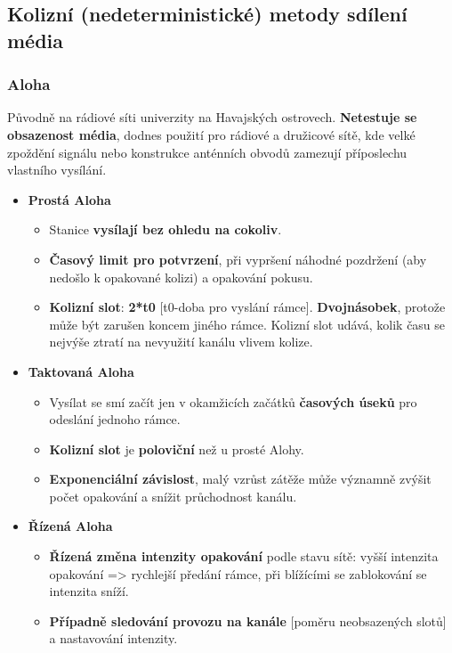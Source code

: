 \subsection{Kolizní (nedeterministické) metody sdílení média}
\subsubsection{Aloha}
Původně na rádiové síti univerzity na Havajských ostrovech. \textbf{Netestuje se obsazenost média}, dodnes použití pro rádiové a družicové sítě, kde velké zpoždění signálu nebo konstrukce anténních obvodů zamezují příposlechu vlastního vysílání.

\begin{itemize}
	\item \textbf{Prostá Aloha}
\begin{itemize}
\item Stanice \textbf{vysílají bez ohledu na cokoliv}.
\item \textbf{Časový limit pro potvrzení}, při vypršení náhodné pozdržení (aby nedošlo k opakované kolizi) a opakování pokusu.
\item \textbf{Kolizní slot}: \textbf{2*t0} [t0-doba pro vyslání rámce]. \textbf{Dvojnásobek}, protože může být zarušen koncem jiného rámce. Kolizní slot udává, kolik času se nejvýše ztratí na nevyužití kanálu vlivem kolize. 
\end{itemize}

\item \textbf{Taktovaná Aloha}
\begin{itemize}
\item Vysílat se smí začít jen v okamžicích začátků \textbf{časových úseků} pro odeslání jednoho rámce.
\item \textbf{Kolizní slot} je \textbf{poloviční} než u prosté Alohy.
\item \textbf{Exponenciální závislost}, malý vzrůst zátěže může významně zvýšit počet opakování a snížit průchodnost kanálu.
\end{itemize}

\item \textbf{Řízená Aloha}
\begin{itemize}
\item \textbf{Řízená změna intenzity opakování} podle stavu sítě: vyšší intenzita opakování => rychlejší předání rámce, při blížícími se zablokování se intenzita sníží.
\item \textbf{Případně sledování provozu na kanále} [poměru neobsazených slotů] a nastavování intenzity.
\end{itemize}
\end{itemize}

